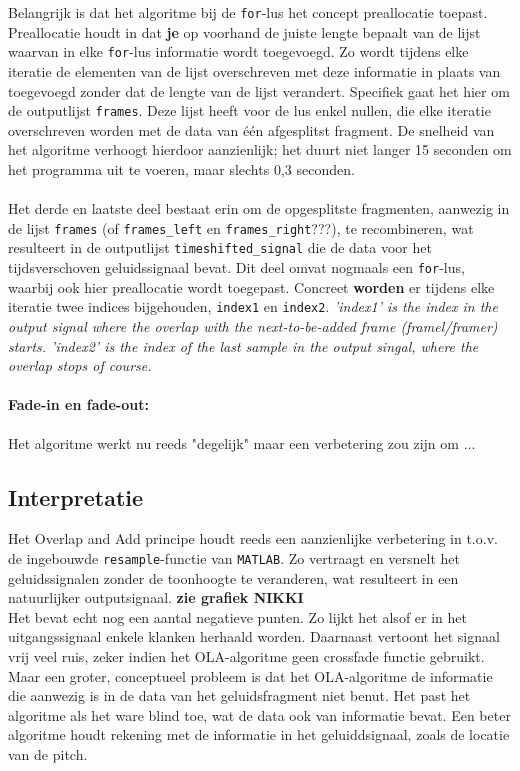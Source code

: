 \documentclass[12pt]{report}
\begin{document}
Belangrijk is dat het algoritme bij de \verb+for+-lus het concept preallocatie toepast. Preallocatie houdt in dat \textbf{je} op voorhand de juiste lengte bepaalt van de lijst waarvan in elke \verb+for+-lus informatie wordt toegevoegd. Zo wordt tijdens elke iteratie de elementen van de lijst overschreven met deze informatie in plaats van toegevoegd zonder dat de lengte van de lijst verandert. Specifiek gaat het hier om de outputlijst \verb+frames+. Deze lijst heeft voor de lus enkel nullen, die elke iteratie overschreven worden met de data van \'e\'en afgesplitst fragment. De snelheid van het algoritme verhoogt hierdoor aanzienlijk; het duurt niet langer 15 seconden om het programma uit te voeren, maar slechts 0,3 seconden.\\
\\
Het derde en laatste deel bestaat erin om de opgesplitste fragmenten, aanwezig in de lijst \verb+frames+ (of \verb+frames_left+ en \verb+frames_right+???), te recombineren, wat resulteert in de outputlijst \verb+timeshifted_signal+ die de data voor het tijdsverschoven geluidssignaal bevat. Dit deel omvat nogmaals een \verb+for+-lus, waarbij ook hier preallocatie wordt toegepast. Concreet \textbf{worden} er tijdens elke iteratie twee indices bijgehouden, \verb+index1+ en \verb+index2+. 
\textit{ 'index1' is the index in the output signal where the overlap with the next-to-be-added frame (framel/framer) starts.
 'index2' is the index of the last sample in the output singal, where the overlap stops of course.}


\paragraph{Fade-in en fade-out:} Het algoritme werkt nu reeds "degelijk" maar een verbetering zou zijn om ...

\subsection{Interpretatie}
Het Overlap and Add principe houdt reeds een aanzienlijke verbetering in t.o.v. de ingebouwde \verb+resample+-functie van \verb+MATLAB+. Zo vertraagt en versnelt het geluidssignalen zonder de toonhoogte te veranderen, wat resulteert in een natuurlijker outputsignaal. \textbf{zie grafiek NIKKI}\\
Het bevat echt nog een aantal negatieve punten. Zo lijkt het alsof er in het uitgangssignaal enkele klanken herhaald worden. Daarnaast vertoont het signaal vrij veel ruis, zeker indien het OLA-algoritme geen crossfade functie gebruikt. Maar een groter, conceptueel probleem is dat het OLA-algoritme de informatie die aanwezig is in de data van het geluidsfragment niet benut. Het past het algoritme als het ware blind toe, wat de data ook van informatie bevat. Een beter algoritme houdt rekening met de informatie in het geluiddsignaal, zoals de locatie van de pitch.
\end{document}
